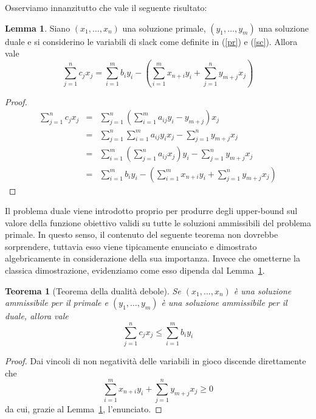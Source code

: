 \documentclass{article}[10pt]
\theoremstyle{theorem}
\newtheorem{theorem}{Teorema}[section]
\theoremstyle{definition}
\theoremstyle{definition}
\newtheorem{lemma}{Lemma}[section]
\theoremstyle{definition}
\begin{document}
	Osserviamo innanzitutto che vale il seguente risultato:
	\begin{lemma} \label{chain}
	Siano $(x_1,\ldots,x_n)$ una soluzione primale, $(y_1,\ldots,y_m)$ una soluzione duale e si considerino le variabili di slack come definite in (\ref{pr}) e (\ref{sc}). Allora vale
		\begin{equation*}
			\sum_{j=1}^{n}c_jx_j = \sum_{i=1}^{m}b_iy_i - \left(\sum_{i=1}^{m}x_{n+i}y_i + \sum_{j=1}^{n}y_{m+j}x_j\right)
		\end{equation*}
	\end{lemma}
	\begin{proof}
	\begin{eqnarray*}
		\sum_{j=1}^{n}c_jx_j & = & \sum_{j=1}^{n}\left(\sum_{i=1}^{m}a_{ij}y_i - y_{m+j}\right)x_j \\
		& = & \sum_{j=1}^{n}\sum_{i=1}^{m}a_{ij}y_ix_j - \sum_{j=1}^{n}y_{m+j}x_j \\
		& = & \sum_{i=1}^{m}\left(\sum_{j=1}^{n}a_{ij}x_j\right)y_i - \sum_{j=1}^{n}y_{m+j}x_j \\
		& = & \sum_{i=1}^{m}b_iy_i - \left(\sum_{i=1}^{m}x_{n+i}y_i + \sum_{j=1}^{n}y_{m+j}x_j\right)
	\end{eqnarray*}
	\end{proof}
	 
	 Il problema duale viene introdotto proprio per produrre degli upper-bound sul valore della funzione obiettivo
         validi su tutte le soluzioni ammissibili del problema primale.
         In questo senso, il contenuto del seguente teorema non dovrebbe sorprendere,
         tuttavia esso viene tipicamente enunciato e dimostrato algebricamente in considerazione della sua importanza.
         Invece che ometterne la classica dimostrazione,
         evidenziamo come esso dipenda dal Lemma~\ref{chain}. 
         
	\begin{theorem}[Teorema della dualità debole] \label{thmd}
		Se $(x_1,\ldots,x_n)$ è una soluzione ammissibile per il primale e $(y_1,\ldots,y_m)$  è una soluzione ammissibile per il duale, allora vale
		\begin{equation*}
		\sum_{j=1}^{n}c_jx_j \leq \sum_{i=1}^{m}b_iy_i
		\end{equation*}
	\end{theorem}
	\begin{proof}
		Dai vincoli di non negatività delle variabili in gioco discende direttamente che 
		\begin{equation*}
		\sum_{i=1}^{m}x_{n+i}y_i + \sum_{j=1}^{n}y_{m+j}x_j \geq 0
		\end{equation*}
		da cui, grazie al Lemma~\ref{chain}, l'enunciato.
	\end{proof}
	
\end{document}
